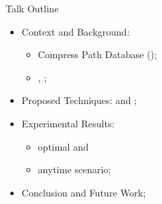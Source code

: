     

\begin{frame}{Talk Outline}
    \begin{itemize}
        \item Context and Background:
        \begin{itemize}
            \item Compress Path Database (\CPD{});
            \item \ALT{}, \AWA{};
        \end{itemize}
        \item Proposed Techniques: \CPDSearch{} and \anytimeCPDSearch{};
        \item Experimental Results: 
            \begin{itemize}
                \item optimal and 
                \item anytime scenario;
            \end{itemize}
        \item Conclusion and Future Work;
    \end{itemize}
\end{frame}